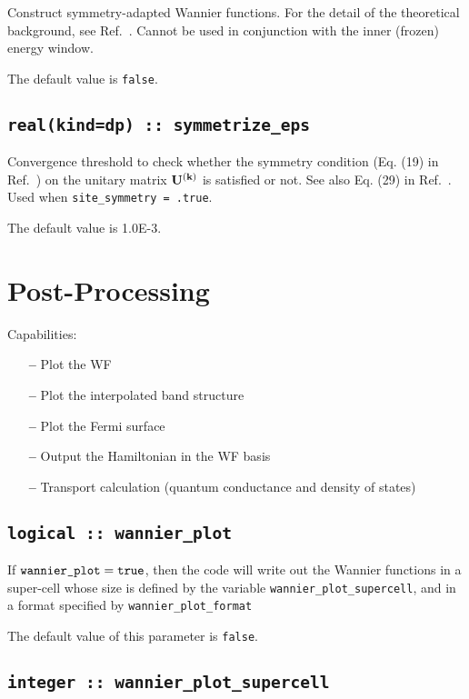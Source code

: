 Construct symmetry-adapted Wannier functions. 
For the detail of the theoretical background, see Ref.~\cite{sakuma-prb13}. 
Cannot be used in conjunction with the inner (frozen) energy window. 

The default value is \verb#false#.

\subsection[symmetrize\_eps]{\tt real(kind=dp) :: symmetrize\_eps}

Convergence threshold to check whether the symmetry condition (Eq. (19) in Ref.~\cite{sakuma-prb13})
on the unitary matrix $\mathbf{U}^{(\mathbf{k})}$ is satisfied or not.  
See also Eq. (29) in Ref.~\cite{sakuma-prb13}. 
Used when \verb#site_symmetry = .true#.

The default value is 1.0E-3.


\section{Post-Processing}
\label{sec:post-p}

 Capabilities:

\begin{itemize}
\item[{\bf --}]  Plot the WF
\item[{\bf --}]  Plot the interpolated band structure 		     
\item[{\bf --}]  Plot the Fermi surface 
\item[{\bf --}]  Output the Hamiltonian in the WF basis			     
\item[{\bf --}]  Transport calculation (quantum conductance and
  density of states)			     
\end{itemize}


\subsection[wannier\_plot]{\tt logical :: wannier\_plot}

If $\verb#wannier_plot#=\verb#true#$, then the code will write out the
Wannier functions in a super-cell whose size is defined by the
variable \verb#wannier_plot_supercell#, and in a format specified by
\verb#wannier_plot_format#

The default value of this parameter is \verb#false#.

\subsection[wannier\_plot\_supercell]{\tt integer :: wannier\_plot\_supercell}

